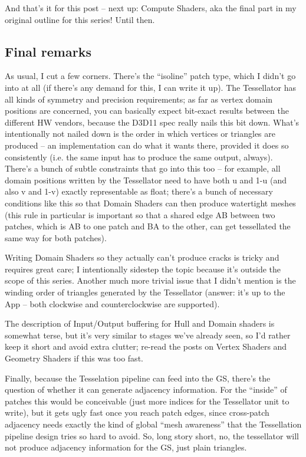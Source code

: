 \documentclass[12pt]{article}
\begin{document}
And that’s it for this post – next up: Compute Shaders, aka the final part in my original outline for this series! Until then.

\subsection{Final remarks}
\label{sec:org6e8bed1}

As usual, I cut a few corners. There’s the “isoline” patch type, which I didn’t go into at all (if there’s any demand for this, I can write it up). The Tessellator has all kinds of symmetry and precision requirements; as far as vertex domain positions are concerned, you can basically expect bit-exact results between the different HW vendors, because the D3D11 spec really nails this bit down. What’s intentionally not nailed down is the order in which vertices or triangles are produced – an implementation can do what it wants there, provided it does so consistently (i.e. the same input has to produce the same output, always). There’s a bunch of subtle constraints that go into this too – for example, all domain positions written by the Tessellator need to have both u and 1-u (and also v and 1-v) exactly representable as float; there’s a bunch of necessary conditions like this so that Domain Shaders can then produce watertight meshes (this rule in particular is important so that a shared edge AB between two patches, which is AB to one patch and BA to the other, can get tessellated the same way for both patches).

Writing Domain Shaders so they actually can’t produce cracks is tricky and requires great care; I intentionally sidestep the topic because it’s outside the scope of this series. Another much more trivial issue that I didn’t mention is the winding order of triangles generated by the Tessellator (answer: it’s up to the App – both clockwise and counterclockwise are supported).

The description of Input/Output buffering for Hull and Domain shaders is somewhat terse, but it’s very similar to stages we’ve already seen, so I’d rather keep it short and avoid extra clutter; re-read the posts on Vertex Shaders and Geometry Shaders if this was too fast.

Finally, because the Tesselation pipeline can feed into the GS, there’s the question of whether it can generate adjacency information. For the “inside” of patches this would be conceivable (just more indices for the Tessellator unit to write), but it gets ugly fast once you reach patch edges, since cross-patch adjacency needs exactly the kind of global “mesh awareness” that the Tessellation pipeline design tries so hard to avoid. So, long story short, no, the tessellator will not produce adjacency information for the GS, just plain triangles.
\end{document}
